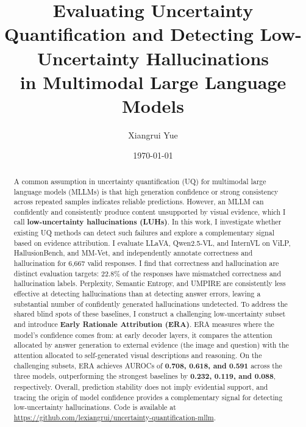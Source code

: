 \documentclass[11pt,a4paper]{article}
\title{\textbf{Evaluating Uncertainty Quantification and Detecting Low-Uncertainty Hallucinations\\in Multimodal Large Language Models}}
\author{Xiangrui Yue}
\date{\today}
\numberwithin{figure}{section}
\numberwithin{table}{section}
\begin{document}
\maketitle

\begin{abstract}
A common assumption in uncertainty quantification (UQ) for multimodal large language models (MLLMs) is that high generation confidence or strong consistency across repeated samples indicates reliable predictions. However, an MLLM can confidently and consistently produce content unsupported by visual evidence, which I call \textbf{low-uncertainty hallucinations (LUHs)}. In this work, I investigate whether existing UQ methods can detect such failures and explore a complementary signal based on evidence attribution. I evaluate LLaVA, Qwen2.5-VL, and InternVL on ViLP, HallusionBench, and MM-Vet, and independently annotate correctness and hallucination for 6,667 valid responses. I find that correctness and hallucination are distinct evaluation targets: 22.8\% of the responses have mismatched correctness and hallucination labels. Perplexity, Semantic Entropy, and UMPIRE are consistently less effective at detecting hallucinations than at detecting answer errors, leaving a substantial number of confidently generated hallucinations undetected. To address the shared blind spots of these baselines, I construct a challenging low-uncertainty subset and introduce \textbf{Early Rationale Attribution (ERA)}. ERA measures where the model's confidence comes from: at early decoder layers, it compares the attention allocated by answer generation to external evidence (the image and question) with the attention allocated to self-generated visual descriptions and reasoning. On the challenging subsets, ERA achieves AUROCs of \textbf{0.708, 0.618, and 0.591} across the three models, outperforming the strongest baselines by \textbf{0.232, 0.119, and 0.088}, respectively. Overall, prediction stability does not imply evidential support, and tracing the origin of model confidence provides a complementary signal for detecting low-uncertainty hallucinations. Code is available at \url{https://github.com/lexiangrui/uncertainty-quantification-mllm}.
\end{abstract}

\setcounter{tocdepth}{2}
\tableofcontents
\clearpage








\appendix



\end{document}
